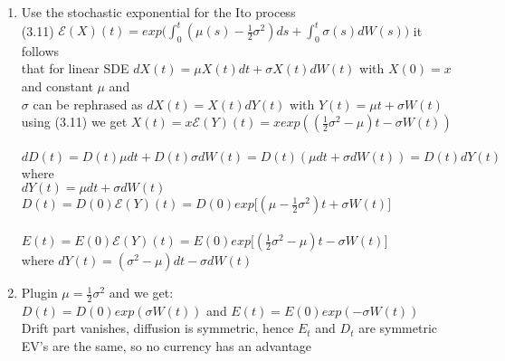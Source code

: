 \documentclass[11pt]{article}
\begin{document}
\begin{enumerate}
\begin{enumerate}
		\item Use the stochastic exponential for the Ito process 
		\\[5pt] (3.11) $\mathcal{E}(X)(t)=exp \bigg(\int_0^t (\mu(s) - \frac{1}{2}\sigma^2)ds + \int_0^t \sigma(s)dW(s) \bigg)$ it follows
		\\[5pt] that for linear SDE $dX(t) = \mu X(t) dt + \sigma X(t) dW(t)$ with $X(0) = x$ and constant $\mu$ and
		\\[5pt] $\sigma$ can be rephrased as $dX(t)=X(t)dY(t)$ with $Y(t) = \mu t + \sigma W(t)$
		\\[5pt] using (3.11) we get $X(t)=x\mathcal{E}(Y)(t)=x exp((\frac{1}{2}\sigma^2 -\mu)t-\sigma W(t))$
		\\
		\\[5pt] $dD(t)=D(t)\mu dt+D(t)\sigma dW(t) = D(t)(\mu dt + \sigma dW(t)) = D(t)dY(t)$ where 
		\\[5pt] $dY(t) = \mu dt + \sigma dW(t)$
		\\[5pt] $D(t)=D(0)\mathcal{E}(Y)(t)=D(0)exp \bigg[ (\mu-\frac{1}{2}\sigma^2)t+\sigma W(t) \bigg]$
		\\
		\\[5pt] $E(t)=E(0)\mathcal{E}(Y)(t)=E(0)exp \bigg[ (\frac{1}{2}\sigma^2 - \mu)t - \sigma W(t) \bigg]$
		\\[5pt] where $dY(t) = (\sigma^2 - \mu)dt-\sigma dW(t)$
		\\
		
		\item Plugin $\mu = \frac{1}{2}\sigma^2$ and we get:
		\\[5pt] $D(t)=D(0)exp(\sigma W (t))$ and $E(t)=E(0)exp(-\sigma W (t))$
		\\[5pt] Drift part vanishes, diffusion is symmetric, hence $E_t$ and $D_t$ are symmetric
		\\[5pt] EV's are the same, so no currency has an advantage
	\end{enumerate}

\end{enumerate}
\end{document}
